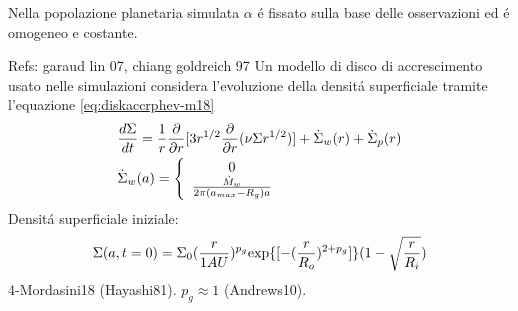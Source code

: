 \begin{workout}
	Nella popolazione planetaria simulata $\alpha$ \'e fissato sulla base delle osservazioni  ed \'e omogeneo e costante.
\end{workout}

\begin{workout}
	Refs: garaud lin 07, chiang goldreich 97
	Un modello di disco  di accrescimento usato nelle simulazioni considera l'evoluzione della densit\'a superficiale tramite l'equazione \eqref{eq:diskaccrphev-m18}
	\begin{align}
	&\frac{d \Sigma}{d t}=\frac{1}{r}\frac{\partial}{\partial r}[3r^{1/2}\frac{\partial}{\partial r}(\nu\Sigma r^{1/2})]+\dot{\Sigma}_w(r)+\dot{\Sigma}_p(r)\label{eq:diskaccrphev-m18}\\
	&\dot{\Sigma}_w(a)=\left\{\begin{array}{c}0\\\frac{\dot{M}_w}{2\pi(a_{max}-R_g)a}\\\end{array}\right.
	\end{align}
	Densit\'a superficiale iniziale:
	\begin{equation}
	\Sigma(a,t=0)=\Sigma_0(\frac{r}{1AU})^{p_g}\text{exp}\{[-(\frac{r}{R_o})^{2+p_g}]\}(1-\sqrt{\frac{r}{R_i}})
	\end{equation}
	4-Mordasini18 (Hayashi81). $p_g\approx1$ (Andrews10).
\end{workout}

